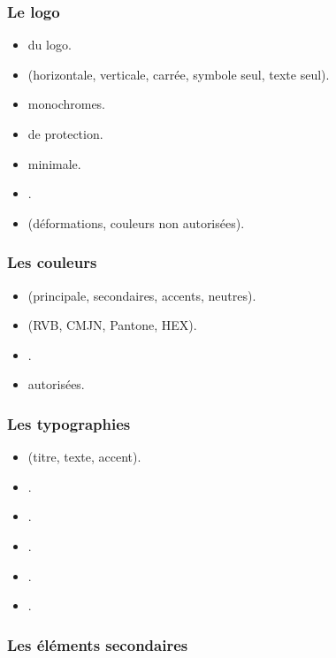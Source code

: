 \subsubsection{Le logo}

\begin{itemize}
    \item {} du logo.
    \item {} (horizontale, verticale, carrée, symbole seul, texte seul).
    \item {} monochromes.
    \item {} de protection.
    \item {} minimale.
    \item {}.
    \item {} (déformations, couleurs non autorisées).
\end{itemize}

\subsubsection{Les couleurs}

\begin{itemize}
    \item {} (principale, secondaires, accents, neutres).
    \item {} (RVB, CMJN, Pantone, HEX).
    \item {}.
    \item {} autorisées.
\end{itemize}

\subsubsection{Les typographies}

\begin{itemize}
    \item {} (titre, texte, accent).
    \item {}.
    \item {}.
    \item {}.
    \item {}.
    \item {}.
\end{itemize}

\subsubsection{Les éléments secondaires}

